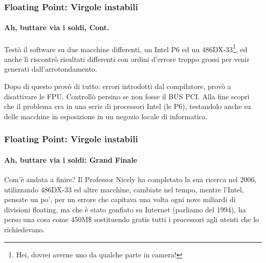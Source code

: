 \documentclass{beamer}
\begin{document}
	  \begin{frame}
	  		\frametitle{Floating Point: Virgole instabili}
	    \framesubtitle{Ah, buttare via i soldi, Cont.}
	  	    
	    Testò il software su due macchine differenti, un Intel P6 ed un 486DX-33\footnote{Hei,
	    dovrei averne uno da qualche parte in camera!}, ed anche lì riscontrò risultati differenti
	    con ordini d'errore troppo grossi per venir generati dall'arrotondamento.
	    
			\vspace{2em}	  	    
	    
	    Dopo di questo provò di tutto: errori introdotti dal compilatore, provò a disattivare le FPU.
	    Controllò persino se non fosse il BUS PCI. Alla fine scoprì che il problema era in una serie
	    di processori Intel (le P6), testandolo anche su delle macchine in esposizione in un negozio
	    locale di informatica.
	    
	  \end{frame}
	  
	  \begin{frame}
	  		\frametitle{Floating Point: Virgole instabili}
	    \framesubtitle{Ah, buttare via i soldi: Grand Finale}
	  	    
	    Com'è andata a finire? Il Professor Nicely ha completato la sua ricerca nel 2006, utilizzando
	    486DX-33 ed altre macchine, cambiate nel tempo, mentre l'Intel, pensate un po', per un errore
	    che capitava una volta ogni nove miliardi di divisioni floating, ma che è stato gonfiato su
	    Internet (parliamo del 1994), ha perso una cosa come 450M\$ sostituendo gratis tutti i processori
	    agli utenti che lo richiedevano.
	    
	  \end{frame}
	  
\end{document}
